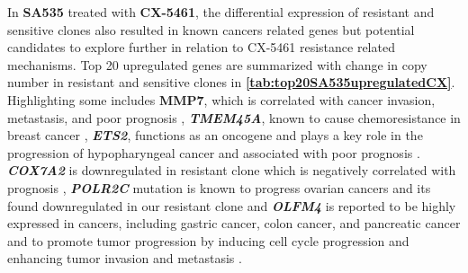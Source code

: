 
In \textbf{SA535} treated with \textbf{CX-5461}, the differential expression of resistant and sensitive clones also resulted in known cancers related genes but potential candidates to explore further in relation to CX-5461 resistance related mechanisms. Top 20 upregulated genes are summarized with change in copy number in resistant and sensitive clones in \textbf{\autoref{tab:top20SA535upregulatedCX}}.
Highlighting some  includes \textbf{MMP7}, which is correlated with cancer invasion, metastasis, and poor prognosis \cite{mcgowan2008matrix} ,
\textit{\textbf{TMEM45A}}, known to cause chemoresistance in breast cancer \cite{schmit2019characterization},
\textit{\textbf{ETS2}}, functions as an oncogene and plays a key role in the progression of hypopharyngeal cancer and associated with poor prognosis \cite{fu2017high, ge2008role}.
\textit{\textbf{COX7A2}} is downregulated in resistant clone which is negatively correlated with prognosis \cite{deng2018overexpression},
\textit{\textbf{POLR2C}} mutation is known to progress ovarian cancers and its found downregulated in our resistant clone \cite {moriwaki2017polr2c} and
\textit{\textbf{OLFM4}} is reported to be highly expressed in cancers, including gastric cancer, colon cancer, and pancreatic cancer and to promote tumor progression by inducing cell cycle progression and enhancing tumor invasion and metastasis \cite{ashizawa2019olfm4}.





